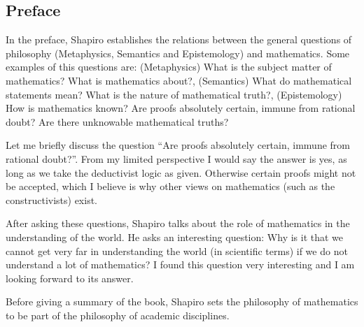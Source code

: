 \subsection{Preface}

In the preface, Shapiro establishes the relations between the general questions of philosophy (Metaphysics, Semantics and Epistemology) and mathematics. Some examples of this questions are: (Metaphysics) What is the subject matter of mathematics? What is mathematics about?, (Semantics) What do mathematical statements mean? What is the nature of mathematical truth?, (Epistemology) How is mathematics known? Are proofs absolutely certain, immune from rational doubt? Are there unknowable mathematical truths?

Let me briefly discuss the question ``Are proofs absolutely certain, immune from rational doubt?''. From my limited perspective I would say the answer is yes, as long as we take the deductivist logic as given. Otherwise certain proofs might not be accepted, which I believe is why other views on mathematics (such as the constructivists) exist.

After asking these questions, Shapiro talks about the role of mathematics in the understanding of the world. He asks an interesting question: Why is it that we cannot get very far in understanding the world (in scientific terms) if we do not understand a lot of mathematics? I found this question very interesting and I am looking forward to its answer.

Before giving a summary of the book, Shapiro sets the philosophy of mathematics to be part of the philosophy of academic disciplines. 